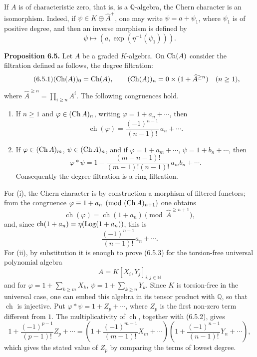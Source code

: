 \documentclass[11pt]{article}
\newcommand{\ch}{\operatorname{ch}}
\providecommand{\ch}{\operatorname{ch}}
\begin{document}
If \(A\) is of characteristic zero, that is, is a \(\mathbb Q\)-algebra, the Chern character is an isomorphism. Indeed, if \(\psi\in K\oplus\widehat A^+\), one may write \(\psi=a+\psi_1\), where \(\psi_1\) is of positive degree, and then an inverse morphism is defined by
\[
  \psi\longmapsto (a,\exp(\eta^{-1}(\psi_1))).
\]

\textbf{Proposition 6.5.} Let \(A\) be a graded \(K\)-algebra. On \(\operatorname{Ch}(A)\) consider the filtration defined as follows, the degree filtration:
\begin{equation}\tag{6.5.1}
  (\operatorname{Ch}(A))_0=\operatorname{Ch}(A),\qquad
  (\operatorname{Ch}(A))_n=0\times(1+\widehat A^{\ge n})\quad(n\ge1),
\end{equation}
where \(\widehat A^{\ge n}=\prod_{i\ge n}A^i\). The following congruences hold.

\begin{enumerate}[label=\roman*)]
\item If \(n\ge1\) and \(\varphi\in(\operatorname{Ch} A)_n\), writing \(\varphi=1+a_n+\cdots\), then
\begin{equation}\tag{6.5.2}
  \ch(\varphi)=\frac{(-1)^{n-1}}{(n-1)!}\,a_n+\cdots .
\end{equation}

\item If \(\varphi\in(\operatorname{Ch} A)_m\), \(\psi\in(\operatorname{Ch} A)_n\), and if
\(\varphi=1+a_m+\cdots\), \(\psi=1+b_n+\cdots\), then
\begin{equation}\tag{6.5.3}
  \varphi*\psi
  =
  1-\frac{(m+n-1)!}{(m-1)!(n-1)!}\,a_m b_n+\cdots .
\end{equation}
Consequently the degree filtration is a ring filtration.
\end{enumerate}

For (i), the Chern character is by construction a morphism of filtered functors; from the congruence \(\varphi\equiv1+a_n\pmod{(\operatorname{Ch} A)_{n+1}}\) one obtains
\[
  \ch(\varphi)=\ch(1+a_n)\pmod{\widehat A^{\ge n+1}},
\]
and, since \(\ch(1+a_n)=\eta(\Log(1+a_n))\), this is
\[
  \frac{(-1)^{n-1}}{(n-1)!}a_n+\cdots .
\]
For (ii), by substitution it is enough to prove (6.5.3) for the torsion-free universal polynomial algebra
\[
 A=K[X_i,Y_j]_{i,j\in\mathbb N}
\]
and for \(\varphi=1+\sum_{k\ge m}X_k\), \(\psi=1+\sum_{k\ge n}Y_k\). Since \(K\) is torsion-free in the universal case, one can embed this algebra in its tensor product with \(\mathbb Q\), so that \(\ch\) is injective. Put \(\varphi*\psi=1+Z_p+\cdots\), where \(Z_p\) is the first non-zero term different from \(1\). The multiplicativity of \(\ch\), together with (6.5.2), gives
\[
  1+\frac{(-1)^{p-1}}{(p-1)!}Z_p+\cdots
  =
  \left(1+\frac{(-1)^{m-1}}{(m-1)!}X_m+\cdots\right)
  \left(1+\frac{(-1)^{n-1}}{(n-1)!}Y_n+\cdots\right),
\]
which gives the stated value of \(Z_p\) by comparing the terms of lowest degree.
\end{document}

